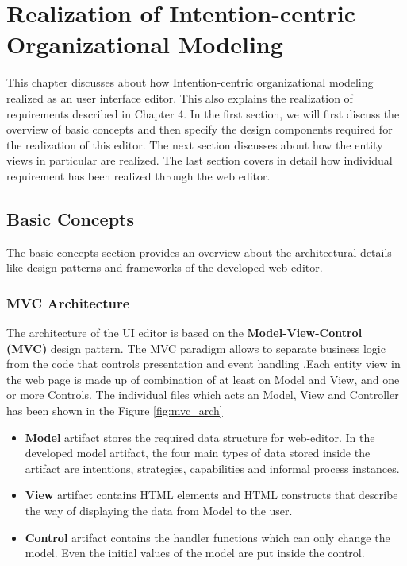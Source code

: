 \chapter{Realization of Intention-centric Organizational Modeling}
\label{chap:realization}
\hspace{4ex} This chapter discusses about how Intention-centric organizational modeling realized as an user interface editor. This also explains the realization of requirements described in Chapter 4. In the first section, we will first discuss the overview of basic concepts and then specify the design components required for the realization of this editor. The next section discusses about how the entity views in particular are realized. The last section covers in detail how individual requirement has been realized through the web editor.


\section{Basic Concepts}
\hspace{4ex} The basic concepts section provides an overview about the architectural details like design patterns and frameworks of the developed web editor.
\subsection{MVC Architecture}
\hspace{4ex} The architecture of the UI editor is based on the \textbf{Model-View-Control (MVC)} design pattern. The MVC paradigm allows to separate business logic from the code that controls presentation and event handling \cite{Oracle2016}.Each entity view in the web page is made up of combination of at least on Model and View, and one or more Controls. The individual files which acts an Model, View and Controller has been shown in the Figure \ref{fig:mvc_arch}

\begin{itemize}
	\item \textbf{Model} artifact stores the required data structure for web-editor. In the developed model artifact, the four main types of data stored inside the artifact are intentions, strategies, capabilities and informal process instances. 
	\item \textbf{View} artifact contains HTML elements and HTML constructs that describe the way of displaying the data from Model to the user.
	\item \textbf{Control} artifact contains the handler functions which can only change the model. Even the initial values of the model are put inside the control. 
\end{itemize}



